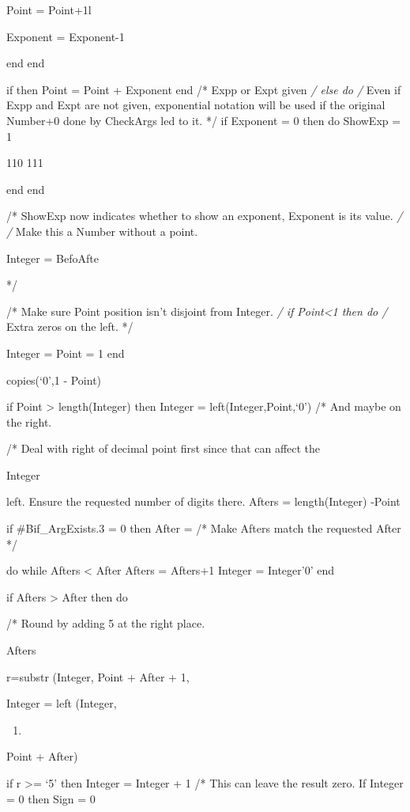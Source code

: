 Point = Point+1l

Exponent = Exponent-1

end end

if \ShowExp then Point = Point + Exponent end /* Expp or Expt given
\emph{/ else do /} Even if Expp and Expt are not given, exponential
notation will be used if the original Number+0 done by CheckArgs led to
it. */ if Exponent = 0 then do ShowExp = 1

110 111

end end

/* ShowExp now indicates whether to show an exponent, Exponent is its
value. \emph{/ /} Make this a Number without a point.

Integer = Befo\textbar\textbar Afte

*/

/* Make sure Point position isn't disjoint from Integer. \emph{/ if
Point\textless1 then do /} Extra zeros on the left. */

Integer = Point = 1 end

copies(`0',1 - Point)

if Point \textgreater{} length(Integer) then Integer =
left(Integer,Point,`0') /* And maybe on the right.

/* Deal with right of decimal point first since that can affect the

\textbar\textbar{} Integer

left. Ensure the requested number of digits there. Afters =
length(Integer) -Point

if \#Bif\_ArgExists.3 = 0 then After = /* Make Afters match the
requested After */

do while Afters \textless{} After Afters = Afters+1 Integer = Integer'0'
end

if Afters \textgreater{} After then do

/* Round by adding 5 at the right place.

Afters

r=substr (Integer, Point + After + 1,

Integer = left (Integer,

\begin{enumerate}
\def\labelenumi{\arabic{enumi})}
\tightlist
\item
\end{enumerate}

Point + After)

if r \textgreater= `5' then Integer = Integer + 1 /* This can leave the
result zero. If Integer = 0 then Sign = 0

